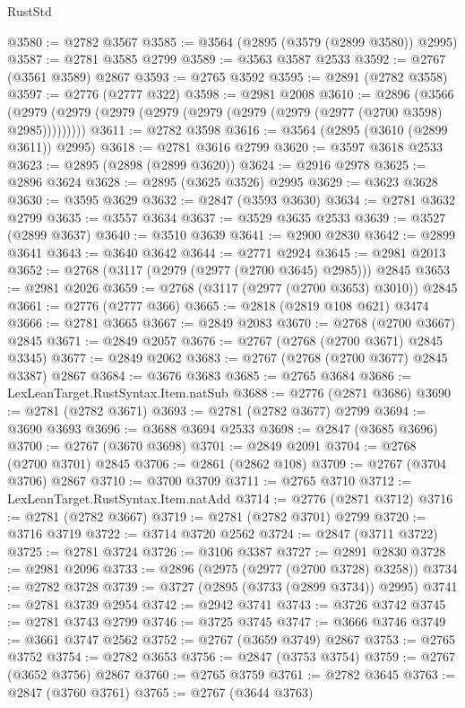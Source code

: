 \begin{lexlean}{RustStd}
\begin{coremodule}
@3580 := @2782 @3567
@3585 := @3564 (@2895 (@3579 (@2899 @3580)) @2995)
@3587 := @2781 @3585 @2799
@3589 := @3563 @3587 @2533
@3592 := @2767 (@3561 @3589) @2867
@3593 := @2765 @3592
@3595 := @2891 (@2782 @3558)
@3597 := @2776 (@2777 @322)
@3598 := @2981 @2008
@3610 := @2896
    (@3566 (@2979 (@2979 (@2979 (@2979 (@2979 (@2979 (@2979 (@2977 (@2700 @3598) @2985)))))))))
@3611 := @2782 @3598
@3616 := @3564 (@2895 (@3610 (@2899 @3611)) @2995)
@3618 := @2781 @3616 @2799
@3620 := @3597 @3618 @2533
@3623 := @2895 (@2898 (@2899 @3620))
@3624 := @2916 @2978
@3625 := @2896 @3624
@3628 := @2895 (@3625 @3526) @2995
@3629 := @3623 @3628
@3630 := @3595 @3629
@3632 := @2847 (@3593 @3630)
@3634 := @2781 @3632 @2799
@3635 := @3557 @3634
@3637 := @3529 @3635 @2533
@3639 := @3527 (@2899 @3637)
@3640 := @3510 @3639
@3641 := @2900 @2830
@3642 := @2899 @3641
@3643 := @3640 @3642
@3644 := @2771 @2924
@3645 := @2981 @2013
@3652 := @2768 (@3117 (@2979 (@2977 (@2700 @3645) @2985))) @2845
@3653 := @2981 @2026
@3659 := @2768 (@3117 (@2977 (@2700 @3653) @3010)) @2845
@3661 := @2776 (@2777 @366)
@3665 := @2818 (@2819 @108 @621) @3474
@3666 := @2781 @3665
@3667 := @2849 @2083
@3670 := @2768 (@2700 @3667) @2845
@3671 := @2849 @2057
@3676 := @2767 (@2768 (@2700 @3671) @2845 @3345)
@3677 := @2849 @2062
@3683 := @2767 (@2768 (@2700 @3677) @2845 @3387) @2867
@3684 := @3676 @3683
@3685 := @2765 @3684
@3686 := LexLeanTarget.RustSyntax.Item.natSub
@3688 := @2776 (@2871 @3686)
@3690 := @2781 (@2782 @3671)
@3693 := @2781 (@2782 @3677) @2799
@3694 := @3690 @3693
@3696 := @3688 @3694 @2533
@3698 := @2847 (@3685 @3696)
@3700 := @2767 (@3670 @3698)
@3701 := @2849 @2091
@3704 := @2768 (@2700 @3701) @2845
@3706 := @2861 (@2862 @108)
@3709 := @2767 (@3704 @3706) @2867
@3710 := @3700 @3709
@3711 := @2765 @3710
@3712 := LexLeanTarget.RustSyntax.Item.natAdd
@3714 := @2776 (@2871 @3712)
@3716 := @2781 (@2782 @3667)
@3719 := @2781 (@2782 @3701) @2799
@3720 := @3716 @3719
@3722 := @3714 @3720 @2562
@3724 := @2847 (@3711 @3722)
@3725 := @2781 @3724
@3726 := @3106 @3387
@3727 := @2891 @2830
@3728 := @2981 @2096
@3733 := @2896 (@2975 (@2977 (@2700 @3728) @3258))
@3734 := @2782 @3728
@3739 := @3727 (@2895 (@3733 (@2899 @3734)) @2995)
@3741 := @2781 @3739 @2954
@3742 := @2942 @3741
@3743 := @3726 @3742
@3745 := @2781 @3743 @2799
@3746 := @3725 @3745
@3747 := @3666 @3746
@3749 := @3661 @3747 @2562
@3752 := @2767 (@3659 @3749) @2867
@3753 := @2765 @3752
@3754 := @2782 @3653
@3756 := @2847 (@3753 @3754)
@3759 := @2767 (@3652 @3756) @2867
@3760 := @2765 @3759
@3761 := @2782 @3645
@3763 := @2847 (@3760 @3761)
@3765 := @2767 (@3644 @3763)

\end{coremodule}
\end{lexlean}

